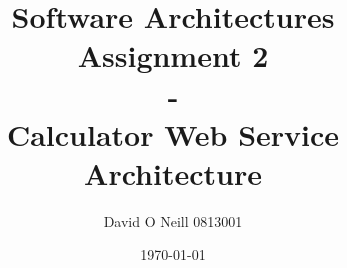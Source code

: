 \documentclass[12pt,a4paper]{report}
\begin{document}
	
	
\title{Software Architectures\\ Assignment 2 \\ - \\Calculator Web Service Architecture }
\author{David O Neill 0813001}
\date{\today}

\begin{titlepage}
\maketitle
\end{titlepage}

\thispagestyle{empty}
\pagestyle{empty}


%


\thispagestyle{empty}
\cleardoublepage
\tableofcontents
\thispagestyle{empty}
\pagestyle{plain}







%
%
\end{document}
